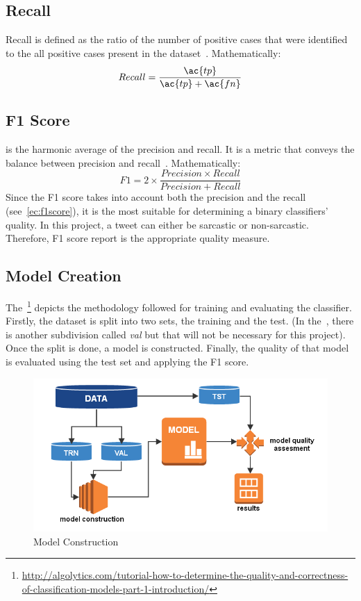 \subsection{Recall}
Recall is defined as the ratio of the number of positive cases that were identified to the all positive cases present in the dataset~\cite{f1score}. Mathematically:
\begin{equation}
Recall = \frac{\ac{tp}}{\ac{tp}+\ac{fn}}
\label{ec:recall}
\end{equation}
\subsection{F1 Score}
is the harmonic average of the precision and recall. It is a metric that conveys the balance between precision and recall~\cite{f1score}. Mathematically:
\begin{equation}
F1 = 2\times \frac{Precision \times Recall}{Precision + Recall}
\label{ec:f1score}
\end{equation}
Since the F1 score takes into account both the precision and the recall (see~\cref{ec:f1score}), it is the most suitable for determining a binary classifiers' quality. In this project, a tweet can either be sarcastic or non-sarcastic. Therefore, F1 score report is the appropriate quality measure.
\subsection{Model Creation}
\label{sec:modcons}
The~\footnote{\url{http://algolytics.com/tutorial-how-to-determine-the-quality-and-correctness-of-classification-models-part-1-introduction/}} depicts the methodology followed for training and evaluating the classifier. Firstly, the dataset is split into two sets, the training and the test. (In the~, there is another subdivision called \textit{val} but that will not be necessary for this project). Once the split is done, a model is constructed. Finally, the quality of that model is evaluated using the test set and applying the F1 score.
\begin{figure}
	\includegraphics[width=\linewidth]{img/model_construction.png}
	\caption[Model Construction]{Model Construction}
	\label{fig:modcons}
\end{figure}
